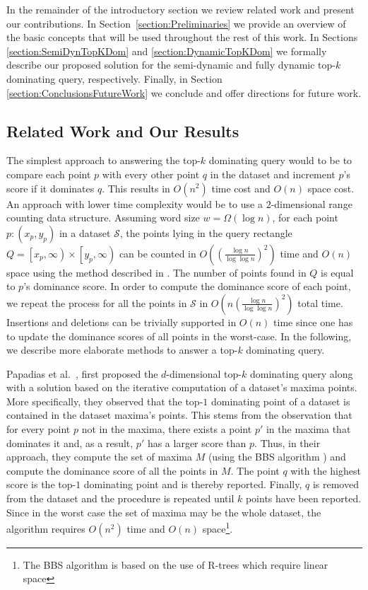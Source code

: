 \documentclass{llncs}
\begin{document}
In the remainder of the introductory section we review related work and present our contributions. In Section~\ref{section:Preliminaries} we provide an overview of the basic concepts that will be used throughout the rest of this work. In Sections \ref{section:SemiDynTopKDom} and \ref{section:DynamicTopKDom} we formally describe our proposed solution for the semi-dynamic and fully dynamic top-$k$ dominating query, respectively. Finally, in Section \ref{section:ConclusionsFutureWork} we conclude and offer directions for future work.





\subsection{Related Work and Our Results} \label{subsection:RelatedWork}
The simplest approach to answering the top-$k$ dominating query would to be to compare each point $p$ with every other point $q$ in the dataset and increment $p$'s score if it dominates $q$. This results in $O(n^{2})$ time cost and $O(n)$ space cost. An approach with lower time complexity would be to use a $2$-dimensional range counting data structure. Assuming word size $w=\Omega{(\log n)}$, for each point $p:(x_p,y_p)$ in a dataset $\mathcal{S}$, the points lying in the query rectangle $Q=\left[ {{x_p},{\infty}} \right) \times \left[ {y_p,\infty } \right)$ can be counted in $O((\frac{\log n}{\log\log n})^2)$ time and $O(n)$ space using the method described in \cite{HeMunroWADS11}. The number of points found in $Q$ is equal to $p$'s dominance score. In order to compute the dominance score of each point, we repeat the process for all the points in $\mathcal{S}$ in $O(n(\frac{\log n}{\log\log n})^2)$ total time. Insertions and deletions can be trivially supported in $O(n)$ time since one has to update the dominance scores of all points in the worst-case. In the following, we describe more elaborate methods to answer a top-$k$ dominating query.

Papadias et al.~\cite{Papadias05}, first proposed the $d$-dimensional top-$k$ dominating query along with a solution based on the iterative computation of a dataset's maxima points. More specifically, they observed that the top-$1$ dominating point of a dataset is contained in the dataset maxima's points. This stems from the observation that for every point $p$ not in the maxima, there exists a point $p'$ in the maxima that dominates it and, as a result, $p'$ has a larger score than $p$. Thus, in their approach, they compute the set of maxima $M$ (using the BBS algorithm \cite{Papadias05}) and compute the dominance score of all the points in $M$. The point $q$ with the highest score is the top-$1$ dominating point and is thereby reported. Finally, $q$ is removed from the dataset and the procedure is repeated until $k$ points have been reported. Since in the worst case the set of maxima may be the whole dataset, the algorithm requires $O(n^2)$ time and $O(n)$ space\footnote{The BBS algorithm is based on the use of R-trees which require linear space}.
\end{document}
